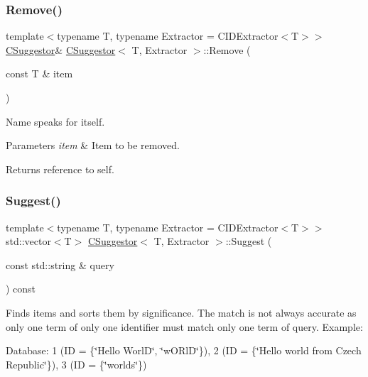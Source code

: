 \subsubsection{\texorpdfstring{Remove()}{Remove()}}
{\footnotesize\ttfamily template$<$typename T, typename Extractor = C\+I\+D\+Extractor$<$\+T$>$$>$ \\
\mbox{\hyperlink{class_c_suggestor}{C\+Suggestor}}\& \mbox{\hyperlink{class_c_suggestor}{C\+Suggestor}}$<$ T, Extractor $>$\+::Remove (\begin{DoxyParamCaption}\item[{const T \&}]{item }\end{DoxyParamCaption})\hspace{0.3cm}{\ttfamily [inline]}}

Name speaks for itself. 
\begin{DoxyParams}{Parameters}
{\em item} & Item to be removed. \\
\hline
\end{DoxyParams}
\begin{DoxyReturn}{Returns}
reference to self. 
\end{DoxyReturn}
\mbox{\label{class_c_suggestor_acc8fed68baf0287a5d4b8204dfc7f392}} 
\subsubsection{\texorpdfstring{Suggest()}{Suggest()}}
{\footnotesize\ttfamily template$<$typename T, typename Extractor = C\+I\+D\+Extractor$<$\+T$>$$>$ \\
std\+::vector$<$T$>$ \mbox{\hyperlink{class_c_suggestor}{C\+Suggestor}}$<$ T, Extractor $>$\+::Suggest (\begin{DoxyParamCaption}\item[{const std\+::string \&}]{query }\end{DoxyParamCaption}) const\hspace{0.3cm}{\ttfamily [inline]}}

Finds items and sorts them by significance. The match is not always accurate as only one term of only one identifier must match only one term of query. Example\+:

Database\+: 1 (ID = \{\char`\"{}\+Hello Worl\+D\char`\"{}, \char`\"{}w\+O\+Rl\+D\char`\"{}\}), 2 (ID = \{\char`\"{}\+Hello world from Czech Republic\char`\"{}\}), 3 (ID = \{\char`\"{}worlds\char`\"{}\})

